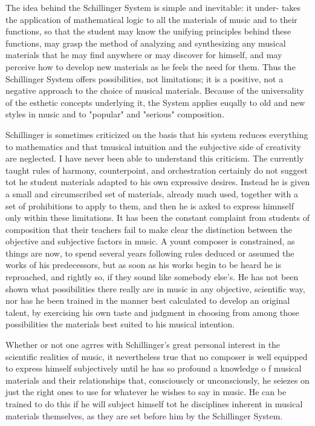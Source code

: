 The idea behind the Schillinger System is simple and inevitable: it under-
takes the application of mathematical logic to all the materials of music and
to their functions, so that the student may know the unifying principles behind
these functions, may grasp the method of analyzing and synthesizing any musical
materials that he may find anywhere or may discover for himself, and may
perceive how to develop new materials as he feels the need for them. Thus the
Schillinger System offers possibilities, not limitations; it is a positive, not
a negative approach to the choice  of musical materials. Because of the
universality of the esthetic concepts underlying it, the System applies euqally
to old and new styles in music and to "popular" and "serious" composition.

Schillinger is sometimes criticized on the basis that his system reduces
everything to mathematics and that tmusical intuition and the subjective side
of creativity are neglected. I have never been able to understand this
criticism. The currently taught rules of harmony, counterpoint, and
orchestration certainly do not suggest tot he student materials adapted to his
own expressive desires. Instead he is given a small and circumscribed set of
materials, already much used, together with a set of prohibitions to apply to
them, and then he is axked to express himnself only within these limitations.
It has been the constant complaint from students of composition that their
teachers fail to make clear the distinction between the objective and
subjective factors in music. A yount composer is constrained, as things are
now, to spend several years following rules deduced or assumed the works of his
predecessors, but as soon as his works begin to be heard he is reproached, and
rightly so, if they sound like somebody else's. He has not been shown what
possibilities there really are in music in any objective, scientific way, nor
has he been trained in the manner best calculated to develop an original
talent, by exercising his own taste and judgment in choosing from among those
possibilities the materials best suited to his musical intention.

Whether or not one agrres with Schillinger's great personal interest in the
scientific realities of music, it nevertheless true that no composer is well
equipped to express himself subjectively until he has so profound a knowledge o
f musical materials and their relationships that, consciouscly or
unconsciously, he seiezes on just the right ones to use for whatever he wishes
to say in music. He can be trained to do this if he will subject himself tot he
disciplines inherent in musical materials themselves, as they are set before
him by the Schillinger System.

